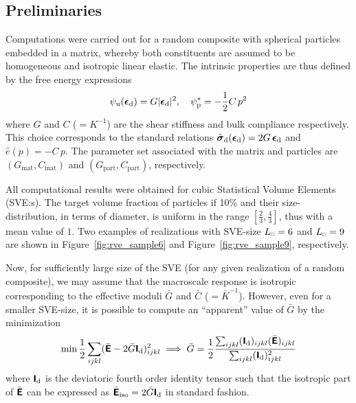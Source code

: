 \documentclass{bmcart}
\newcommand{\figref}[1]{Figure~\ref{#1}}
\renewcommand{\dev}{\mathrm{d}}
\newcommand{\rve}{
  {\mathchoice
   {\mbox{\scalebox{0.67}{$\Box$}}}
   {\mbox{\scalebox{0.67}{$\Box$}}}
   {\mbox{\scalebox{0.5}{$\Box$}}}
   {\mbox{\scalebox{0.375}{$\Box$}}}
  }
}
\begin{document}
\subsection{Preliminaries}
Computations were carried out for a random composite with spherical particles embedded in a matrix, whereby both constituents are assumed to be homogeneous and isotropic linear elastic.
The intrinsic properties are thus defined by the free energy expressions
\begin{align}
 \psi_\mathrm{u}(\ts\epsilon_\dev) = G |\ts\epsilon_\dev|^2,\quad \psi^*_{\mathrm{p}} = -\frac12 C\, p^2
\end{align}
where $G$ and $C$ ($=K^{-1}$) are the shear stiffness and bulk compliance respectively.
This choice corresponds to the standard relations
$\hat{\ts\sigma}_\dev(\ts\epsilon_\dev) = 2 G\,\ts\epsilon_\dev$ and $\hat{e}(p) = -C\, p$.
The parameter set associated with the matrix and particles are $(G_\mathrm{mat},C_\mathrm{mat})$ and $(G_\mathrm{part},C_\mathrm{part})$, respectively.

All computational results were obtained for cubic Statistical Volume Elements (SVE:s).
The target volume fraction of particles if 10\% and their size-distribution, in terms of diameter, is uniform in the range $[\frac23 ,\frac43]$, thus with a mean value of $1$.
Two examples of realizations with SVE-size $L_\rve = 6$ and $L_\rve = 9$ are shown in \figref{fig:rve_sample6} and \figref{fig:rve_sample9}, respectively.

% 

Now, for sufficiently large size of the SVE (for any given realization of a random composite), we may assume that the macroscale response is isotropic corresponding to the effective moduli $\bar{G}$ and $\bar{C}$ ($=\bar{K}^{-1}$).
However, even for a smaller SVE-size, it is possible to compute an ``apparent'' value of $\bar{G}$ by the minimization
\begin{align}
 \min \frac12 \sum_{ijkl} (\bar{\tf E} - 2 \bar{G} \tf I_\dev)_{ijkl}^2 \implies \bar{G} = \frac12 \frac{\sum_{ijkl}(\tf I_\dev)_{ijkl}(\bar{\tf E})_{ijkl}}{\sum_{ijkl} (\tf I_\dev)_{ijkl}^2}
\end{align}
where $\tf I_\dev$ is the deviatoric fourth order identity tensor such that the isotropic part of $\bar{\boldsymbol{\mathsf{E}}}$ can be expressed as $\bar{\tf E}_{\mathrm{iso}} = 2 \bar{G} \tf I_\dev$ in standard fashion.
\end{document}
